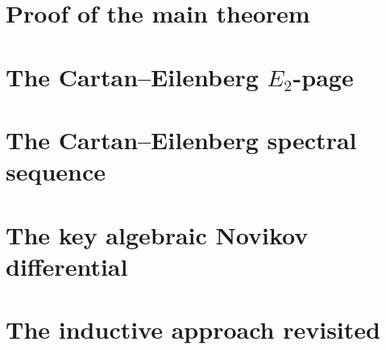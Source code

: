 \documentclass[reqno]{amsart}
\begin{document}
\section{Proof of the main theorem}
\label{sec:proof}


%

%

\section{The Cartan--Eilenberg $E_2$-page}
\label{sec:algAH}


\section{The Cartan--Eilenberg spectral sequence}
\label{sec:cess}


% 

% 

\section{The key algebraic Novikov differential}
\label{sec:alg-nov-diff}



\section{The inductive approach revisited}
\label{sec:kervaire}

\end{document}
